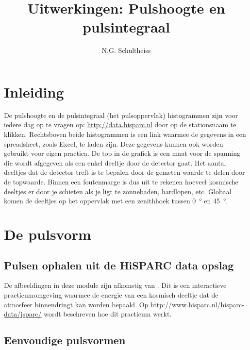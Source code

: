 

\title{Uitwerkingen: Pulshoogte en pulsintegraal}
\author{N.G. Schultheiss}



\maketitle

\section{Inleiding}

De pulshoogte en de pulsintegraal (het pulsoppervlak) histogrammen zijn
voor iedere dag op te vragen op: \url{http://data.hisparc.nl} door op de
stationsnaam te klikken. Rechtsboven beide histogrammen is een link
waarmee de gegevens in een spreadsheet, zoals Excel, te laden zijn. Deze
gegevens kunnen ook worden gebruikt voor eigen practica. De top in de
grafiek is een maat voor de spanning die wordt afgegeven als een enkel
deeltje door de detector gaat. Het aantal deeltjes dat de detector treft
is te bepalen door de gemeten waarde te delen door de topwaarde. Binnen
een foutenmarge is dus uit te rekenen hoeveel kosmische deeltjes er door
je schieten als je ligt te zonnebaden, hardlopen, etc. Globaal komen de
deeltjes op het oppervlak met een zenithhoek tussen \SI{0}{\degree} en
\SI{45}{\degree}.


\section{De pulsvorm}


\subsection{Pulsen ophalen uit de HiSPARC data opslag}

De afbeeldingen in deze module zijn afkomstig van \jsparc. Dit is een
interactieve practicumomgeving waarmee de energie van een kosmisch
deeltje dat de atmosfeer binnendringt kan worden bepaald. Op
\url{http://www.hisparc.nl/hisparc-data/jsparc/} wordt beschreven hoe
dit practicum werkt.


\subsection{Eenvoudige pulsvormen}

